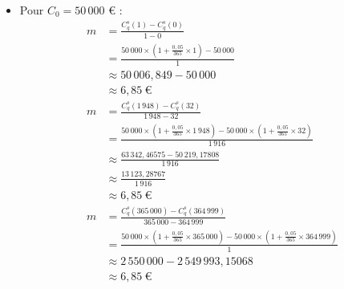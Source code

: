 \documentclass{article}
\begin{document}
\begin{enumerate}[label=\textbf{R1.\arabic*}]
          \begin{itemize}
              \item Pour \( C_0 = 50\,000 \) € :
                    \[
                        \begin{aligned}
                            m & = \frac{C^s_q(1) - C^s_q(0)}{1 - 0}                                                                                                                 \\
                              & = \frac{50\,000 \times \left(1 + \frac{0{,}05}{365} \times 1\right) - 50\,000}{1}                                                                   \\
                              & \approx 50\,006{,}849 - 50\,000                                                                                                                     \\
                              & \approx 6{,}85\ \text{€}                                                                                                                          \\[1em]
                            m & = \frac{C^s_q(1\,948) - C^s_q(32)}{1\,948 - 32}                                                                                                     \\
                              & = \frac{50\,000 \times \left(1 + \frac{0{,}05}{365} \times 1\,948\right) - 50\,000 \times \left(1 + \frac{0{,}05}{365} \times 32\right)}{1\,916}    \\
                              & \approx \frac{63\,342{,}46575 - 50\,219{,}17808}{1\,916}                                                                                            \\
                              & \approx \frac{13\,123{,}28767}{1\,916}                                                                                                              \\
                              & \approx 6{,}85\ \text{€}                                                                                                                          \\[1em]
                            m & = \frac{C^s_q(365\,000) - C^s_q(364\,999)}{365\,000 - 364\,999}                                                                                     \\
                              & = \frac{50\,000 \times \left(1 + \frac{0{,}05}{365} \times 365\,000\right) - 50\,000 \times \left(1 + \frac{0{,}05}{365} \times 364\,999\right)}{1} \\
                              & \approx 2\,550\,000 - 2\,549\,993,15068                                                                                                             \\
                              & \approx 6{,}85\ \text{€}                                                                                                                          
                        \end{aligned}
                    \]
                        

\end{itemize}
\end{enumerate}
\end{document}
